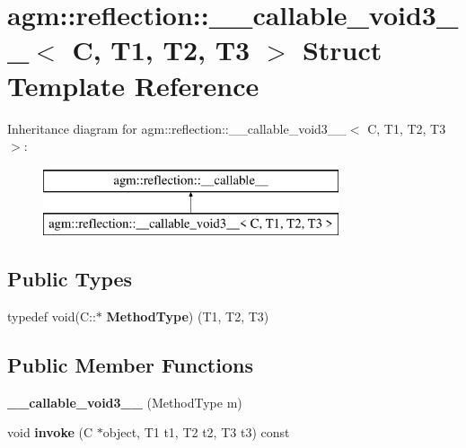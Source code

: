 \hypertarget{structagm_1_1reflection_1_1____callable__void3____}{}\section{agm\+:\+:reflection\+:\+:\+\_\+\+\_\+callable\+\_\+void3\+\_\+\+\_\+$<$ C, T1, T2, T3 $>$ Struct Template Reference}
\label{structagm_1_1reflection_1_1____callable__void3____}
Inheritance diagram for agm\+:\+:reflection\+:\+:\+\_\+\+\_\+callable\+\_\+void3\+\_\+\+\_\+$<$ C, T1, T2, T3 $>$\+:\begin{figure}[H]
\begin{center}
\leavevmode
\includegraphics[height=2.000000cm]{structagm_1_1reflection_1_1____callable__void3____}
\end{center}
\end{figure}
\subsection*{Public Types}
\begin{DoxyCompactItemize}
\item 
typedef void(C\+::$\ast$ {\bfseries Method\+Type}) (T1, T2, T3)\hypertarget{structagm_1_1reflection_1_1____callable__void3_____a01735d6e1b51ed653887df56175961c8}{}\label{structagm_1_1reflection_1_1____callable__void3_____a01735d6e1b51ed653887df56175961c8}

\end{DoxyCompactItemize}
\subsection*{Public Member Functions}
\begin{DoxyCompactItemize}
\item 
{\bfseries \+\_\+\+\_\+callable\+\_\+void3\+\_\+\+\_\+} (Method\+Type m)\hypertarget{structagm_1_1reflection_1_1____callable__void3_____a21111e4f267e4fa99146030501fb05fc}{}\label{structagm_1_1reflection_1_1____callable__void3_____a21111e4f267e4fa99146030501fb05fc}

\item 
void {\bfseries invoke} (C $\ast$object, T1 t1, T2 t2, T3 t3) const \hypertarget{structagm_1_1reflection_1_1____callable__void3_____a9ec8b57a966ebedef36adc06669e7a2e}{}\label{structagm_1_1reflection_1_1____callable__void3_____a9ec8b57a966ebedef36adc06669e7a2e}

\end{DoxyCompactItemize}
